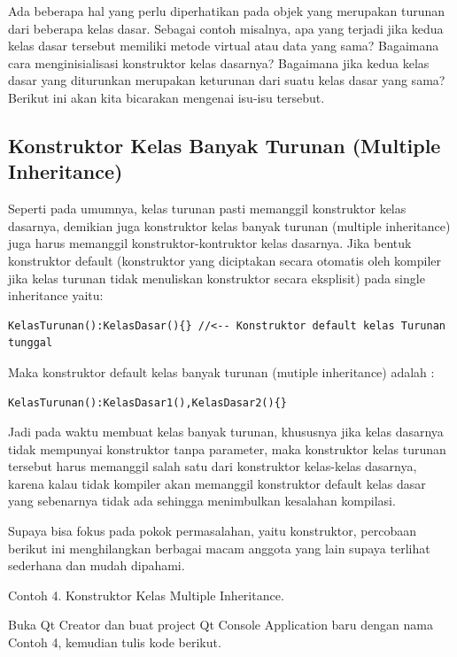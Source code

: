 Ada beberapa hal yang perlu diperhatikan pada objek yang merupakan
turunan dari beberapa kelas dasar. Sebagai contoh misalnya, apa yang
terjadi jika kedua kelas dasar tersebut memiliki metode virtual atau
data yang sama? Bagaimana cara menginisialisasi konstruktor kelas
dasarnya? Bagaimana jika kedua kelas dasar yang diturunkan merupakan
keturunan dari suatu kelas dasar yang sama? Berikut ini akan kita
bicarakan mengenai isu-isu tersebut.

\subsection{Konstruktor Kelas Banyak Turunan (Multiple
Inheritance)}\label{konstruktor-kelas-banyak-turunan-multiple-inheritance}

Seperti pada umumnya, kelas turunan pasti memanggil konstruktor kelas
dasarnya, demikian juga konstruktor kelas banyak turunan (multiple
inheritance) juga harus memanggil konstruktor-kontruktor kelas dasarnya.
Jika bentuk konstruktor default (konstruktor yang diciptakan secara
otomatis oleh kompiler jika kelas turunan tidak menuliskan konstruktor
secara eksplisit) pada single inheritance yaitu:

\begin{verbatim}
KelasTurunan():KelasDasar(){} //<-- Konstruktor default kelas Turunan tunggal
\end{verbatim}

Maka konstruktor default kelas banyak turunan (mutiple inheritance)
adalah :

\begin{verbatim}
KelasTurunan():KelasDasar1(),KelasDasar2(){}
\end{verbatim}

Jadi pada waktu membuat kelas banyak turunan, khususnya jika kelas
dasarnya tidak mempunyai konstruktor tanpa parameter, maka konstruktor
kelas turunan tersebut harus memanggil salah satu dari konstruktor
kelas-kelas dasarnya, karena kalau tidak kompiler akan memanggil
konstruktor default kelas dasar yang sebenarnya tidak ada sehingga
menimbulkan kesalahan kompilasi.

Supaya bisa fokus pada pokok permasalahan, yaitu konstruktor, percobaan
berikut ini menghilangkan berbagai macam anggota yang lain supaya
terlihat sederhana dan mudah dipahami.

Contoh 4. Konstruktor Kelas Multiple Inheritance.

Buka Qt Creator dan buat project Qt Console Application baru dengan nama
Contoh 4, kemudian tulis kode berikut.

